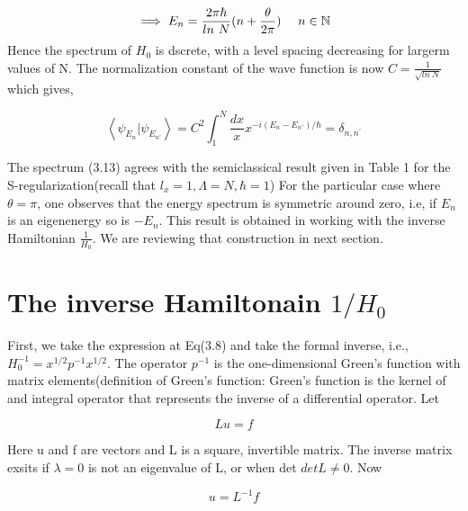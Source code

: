 \documentclass[12pt]{report}
\newcommand*{\1}{\hspace{1pt}}
\begin{document}
        \begin{equation}
            \implies E_{n}  = \frac{2\pi\hbar}{ln \ N}(n+\frac{\theta}{2\pi})  \ \ \ \ n \in \mathbb{N}\\
        \end{equation}
        Hence the spectrum of $H_{0}$ is dscrete, with a level spacing decreasing for largerm values of N. The normalization constant of the wave function is now 
        $C = \frac{1}{\sqrt{ln \ N}}$ which gives,

        \begin{equation}
            \left\langle\psi_{E_{n}}|\psi_{E_{n'}}\right\rangle = C^{2} \int_{1}^{N} \frac{dx}{x} x^{-i(E_{n}-E_{n'})/\hbar} = \delta_{n,n^{'}}
        \end{equation}
        
        The spectrum (3.13) agrees with the semiclassical result given in Table 1 for the S-regularization(recall that $l_{x} = 1, \Lambda = N, \hbar=1$)
        For the particular case where $\theta=\pi$, one observes that the energy spectrum is symmetric around zero, i.e, if $E_{n}$ is an eigenenergy so is $-E_{n}$.
        This result is obtained in working\cite{s10} with the inverse Hamiltonian $\frac{1}{H_{0}}$. We are reviewing that construction in next section.

        \section{The inverse Hamiltonain $1/H_{0}$}

        First, we take the expression at Eq(3.8) and take the formal inverse, i.e., $H_{0} ^{-1} = x^{1/2}p^{-1}x^{1/2}$. The operator $p^{-1}$ is the one-dimensional
        Green's function with matrix elements(definition of Green's function: Green's function is the kernel of and integral operator that represents the inverse
        of a differential operator. Let 

        \begin{equation}
                Lu = f
        \end{equation}

        Here u and f are vectors and L is a square, invertible matrix. The inverse matrix exsits if $\lambda=0$ is not an eigenvalue of L, or when det $det L \neq 0$.
        Now

        \begin{equation}
            u = L^{-1}f
        \end{equation}
\end{document}
